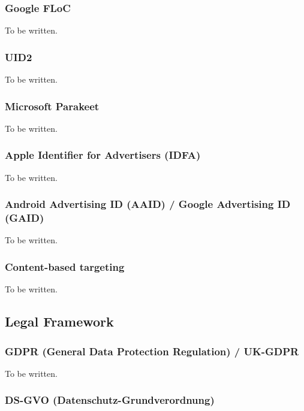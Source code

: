\subsubsection{Google FLoC}

To be written.

\subsubsection{UID2}

To be written.

\subsubsection{Microsoft Parakeet}

To be written.

\subsubsection{Apple Identifier for Advertisers (IDFA)}

To be written.

\subsubsection{Android Advertising ID (AAID) / Google Advertising ID (GAID)}

To be written.

\subsubsection{Content-based targeting}

To be written.

\subsection{Legal Framework}

\subsubsection{GDPR (General Data Protection Regulation) / UK-GDPR}

To be written.

\subsubsection{DS-GVO (Datenschutz-Grundverordnung)}

